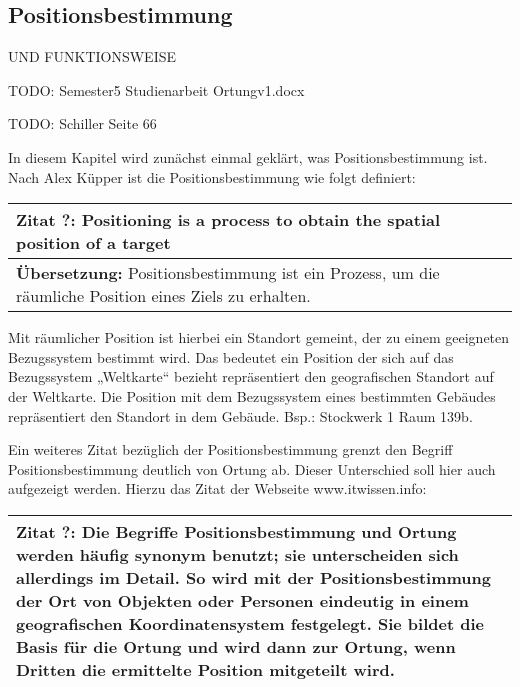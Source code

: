 \subsection{Positionsbestimmung}
UND FUNKTIONSWEISE

TODO:
Semester5 Studienarbeit Ortungv1.docx

TODO:
Schiller Seite 66

In diesem Kapitel wird zunächst einmal geklärt, was Positionsbestimmung ist. 
Nach Alex Küpper ist die Positionsbestimmung wie folgt definiert:

\begin{table}[h]
	\centering
	\begin{tabular}{|p{16cm}|}\hline
		\textbf{Zitat ?:} \glqq Positioning is a process to obtain the spatial position of a target \grqq  \cite[S.121]{Kuepper2005} \\ \hline
		\textbf{Übersetzung:} Positionsbestimmung ist ein Prozess, um die räumliche Position eines Ziels zu erhalten. \\ \hline
	\end{tabular}
\end{table}

Mit räumlicher Position ist hierbei ein Standort gemeint, der zu einem geeigneten Bezugssystem bestimmt wird. Das bedeutet ein Position der sich auf das Bezugssystem „Weltkarte“ bezieht repräsentiert den geografischen Standort auf der Weltkarte. Die Position mit dem Bezugssystem eines bestimmten Gebäudes repräsentiert den Standort in dem Gebäude. Bsp.: Stockwerk 1 Raum 139b.

Ein weiteres Zitat bezüglich der Positionsbestimmung grenzt den Begriff Positionsbestimmung deutlich von Ortung ab. Dieser Unterschied soll hier auch aufgezeigt werden. Hierzu das Zitat der Webseite www.itwissen.info:

\begin{table}[h]
	\centering
	\begin{tabular}{|p{16cm}|}\hline
		\textbf{Zitat ?:} \glqq Die Begriffe Positionsbestimmung und Ortung werden häufig synonym benutzt; sie unterscheiden sich allerdings im Detail. So wird mit der Positionsbestimmung der Ort von Objekten oder Personen eindeutig in einem geografischen Koordinatensystem festgelegt. Sie bildet die Basis für die Ortung und wird dann zur Ortung, wenn Dritten die ermittelte Position mitgeteilt wird. \grqq  \cite[Positionsbestimmung]{itwissen} \\ \hline
	\end{tabular}
\end{table}

